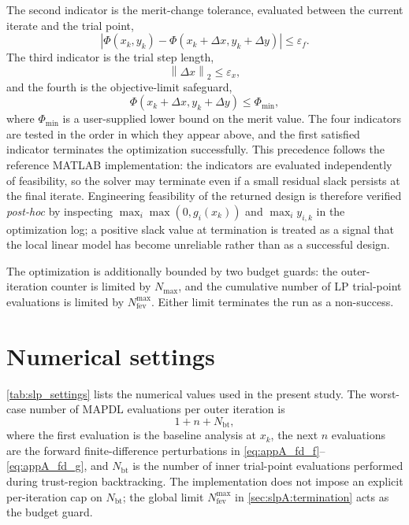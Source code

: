 The second indicator is the merit-change tolerance, evaluated between
the current iterate and the trial point,
\begin{equation}
\label{eq:appA_stop_merit}
    \left|
        \Phi(x_k,y_k) - \Phi(x_k+\Delta x,y_k+\Delta y)
    \right|
    \leq
    \varepsilon_f .
\end{equation}
The third indicator is the trial step length,
\begin{equation}
\label{eq:appA_stop_step}
    \left\|\Delta x\right\|_2
    \leq
    \varepsilon_x ,
\end{equation}
and the fourth is the objective-limit safeguard,
\begin{equation}
\label{eq:appA_stop_obj}
    \Phi(x_k+\Delta x,y_k+\Delta y) \leq \Phi_{\min} ,
\end{equation}
where $\Phi_{\min}$ is a user-supplied lower bound on the merit
value. The four indicators are tested in the order in which they
appear above, and the first satisfied indicator terminates the
optimization successfully. This precedence follows the reference
MATLAB implementation: the indicators are evaluated independently of
feasibility, so the solver may terminate even if a small residual
slack persists at the final iterate. Engineering feasibility of the
returned design is therefore verified \emph{post-hoc} by inspecting
$\max_i\max(0,g_i(x_k))$ and $\max_i y_{i,k}$ in the optimization
log; a positive slack value at termination is treated as a signal
that the local linear model has become unreliable rather than as a
successful design.

The optimization is additionally bounded by two budget guards: the
outer-iteration counter is limited by $N_{\max}$, and the cumulative
number of LP trial-point evaluations is limited by
$N_{\mathrm{fev}}^{\max}$. Either limit terminates the run as a
non-success.

\section{Numerical settings}
\label{sec:slpA:settings}

\autoref{tab:slp_settings} lists the numerical values used in the
present study. The worst-case number of MAPDL evaluations per outer
iteration is
\begin{equation}
\label{eq:appA_fea_cost}
    1+n+N_{\mathrm{bt}},
\end{equation}
where the first evaluation is the baseline analysis at $x_k$, the
next $n$ evaluations are the forward finite-difference perturbations
in \autoref{eq:appA_fd_f}--\autoref{eq:appA_fd_g}, and
$N_{\mathrm{bt}}$ is the number of inner trial-point evaluations
performed during trust-region backtracking. The implementation does
not impose an explicit per-iteration cap on $N_{\mathrm{bt}}$; the
global limit $N_{\mathrm{fev}}^{\max}$ in
\autoref{sec:slpA:termination} acts as the budget guard.

